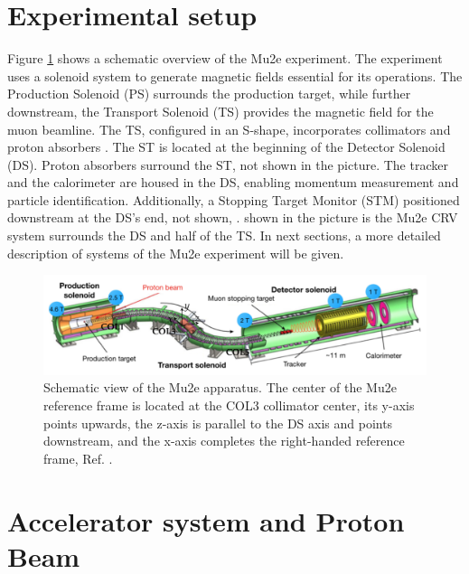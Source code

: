 \section{Experimental setup}\label{setup}
Figure \ref{fig:mu2escheme} shows a schematic overview 
of the Mu2e experiment. The experiment uses 
a solenoid system to generate magnetic fields essential 
for its operations. The Production Solenoid (PS) surrounds 
the production target, while further downstream, the 
Transport Solenoid (TS) provides the magnetic field for 
the muon beamline. The TS, configured in an S-shape, 
incorporates collimators and proton absorbers . The ST is 
located at the beginning of the Detector Solenoid (DS). 
Proton absorbers surround the ST, not shown in the picture. 
The tracker and the calorimeter are housed in the DS, 
enabling momentum measurement and particle identification. 
Additionally, a Stopping Target Monitor (STM) positioned 
downstream at the DS's end, not shown, 
.
 shown 
in the picture is the Mu2e CRV system 
surrounds the DS and half of the TS. In next sections, a 
more detailed description of systems of the Mu2e experiment will be given.
\begin{figure}[!h]
\centering
\includegraphics[width =\textwidth]{figures/png/Screenshot_20240301_143105.png}
\caption[The Mu2e apparatus.]{Schematic view of the Mu2e apparatus. The center of the Mu2e reference frame is located at the COL3 collimator center, its y-axis points upwards, the z-axis is parallel to the DS axis and points downstream, and the x-axis completes the right-handed reference frame, Ref. \cite{universe9010054}.}
\label{fig:mu2escheme}
\end{figure}
\section{Accelerator system and  Proton Beam}\label{accel}
